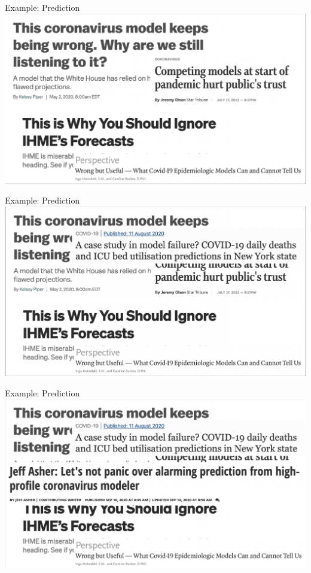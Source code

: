 \documentclass[10pt,t]{beamer}
\begin{document}
\begin{frame}[c]{Example: Prediction}
\centering \includegraphics[scale=0.35]{ihme4.png}
\end{frame}

\begin{frame}[c]{Example: Prediction}
\centering \includegraphics[scale=0.35]{ihme5.png}
\end{frame}

\begin{frame}[c]{Example: Prediction}
\centering \includegraphics[scale=0.35]{ihme6.png}
\end{frame}
\end{document}
